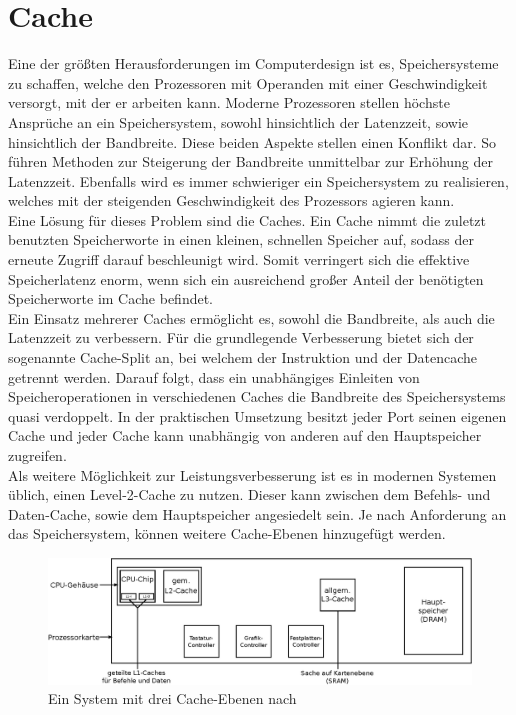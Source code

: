 \section{Cache}\label{kap:cache}
Eine der größten Herausforderungen im Computerdesign ist es, Speichersysteme zu schaffen, welche den Prozessoren mit Operanden mit einer Geschwindigkeit versorgt, mit der er arbeiten kann.
Moderne Prozessoren stellen höchste Ansprüche an ein Speichersystem, sowohl hinsichtlich der Latenzzeit, sowie hinsichtlich der Bandbreite. Diese beiden Aspekte stellen einen Konflikt dar. So führen
Methoden zur Steigerung der Bandbreite unmittelbar zur Erhöhung der Latenzzeit.
Ebenfalls wird es immer schwieriger ein Speichersystem zu realisieren, welches mit der steigenden Geschwindigkeit des Prozessors agieren kann.\\
Eine Lösung für dieses Problem sind die Caches. Ein Cache nimmt die zuletzt benutzten Speicherworte in einen kleinen, schnellen Speicher auf, sodass der erneute Zugriff darauf beschleunigt wird.
Somit verringert sich die effektive Speicherlatenz enorm, wenn sich ein ausreichend großer Anteil der benötigten Speicherworte im Cache befindet.\\
Ein Einsatz mehrerer Caches ermöglicht es, sowohl die Bandbreite, als auch die Latenzzeit zu verbessern. Für die grundlegende Verbesserung bietet sich der sogenannte Cache-Split an, bei
welchem der Instruktion und der Datencache getrennt werden. Darauf folgt, dass ein unabhängiges Einleiten von Speicheroperationen in verschiedenen Caches die Bandbreite des
Speichersystems quasi verdoppelt. In der praktischen Umsetzung besitzt jeder Port seinen eigenen Cache und jeder Cache kann unabhängig von anderen auf den Hauptspeicher zugreifen.\\
Als weitere Möglichkeit zur Leistungsverbesserung ist es in modernen Systemen üblich, einen Level-2-Cache zu nutzen. Dieser kann zwischen dem Befehls- und Daten-Cache, sowie dem Hauptspeicher
angesiedelt sein. Je nach Anforderung an das Speichersystem, können weitere Cache-Ebenen hinzugefügt werden. \\


\begin{figure}[H]
\centering
\includegraphics[width=1\textwidth]{Hauptteil/Cache.eps}
\caption{Ein System mit drei Cache-Ebenen nach~\cite{cache}}\label{fig:cache}
\end{figure}





